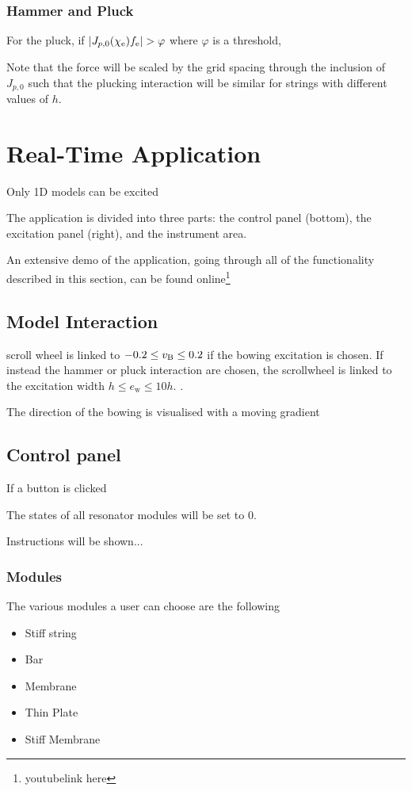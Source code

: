 \documentclass{article}
\begin{document}
\subsubsection{Hammer and Pluck}


For the pluck, if $|J_{p, 0}(\chi_{\text{e}}) f_{\text{e}}| > \varphi$ where $\varphi$ is a threshold, 

Note that the force will be scaled by the grid spacing through the inclusion of $J_{p, 0}$ such that the plucking interaction will be similar for strings with different values of $h$. 

\section{Real-Time Application}
Only 1D models can be excited

The application is divided into three parts: the control panel (bottom), the excitation panel (right), and the instrument area. 

An extensive demo of the application, going through all of the functionality described in this section, can be found online\footnote{youtubelink here}

\subsection{Model Interaction}
scroll wheel is linked to $-0.2 \leq v_{\text{B}} \leq 0.2$ if the bowing excitation is chosen. If instead the hammer or pluck interaction are chosen, the scrollwheel is linked to the excitation width $h \leq e_\text{w} \leq 10 h$. . 

The direction of the bowing is visualised with a moving gradient 
\subsection{Control panel}
If a button is clicked

The states of all resonator modules will be set to 0.

Instructions will be shown... 
\subsubsection{Modules}
The various modules a user can choose are the following
\begin{itemize}
    \item Stiff string
    \item Bar
    \item Membrane
    \item Thin Plate
    \item Stiff Membrane
\end{itemize}
\end{document}
